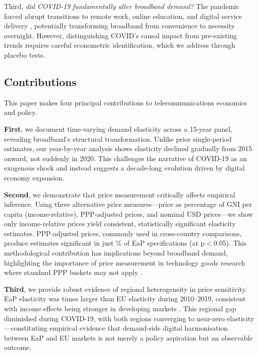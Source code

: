 Third, \textit{did COVID-19 fundamentally alter broadband demand?} The pandemic forced abrupt transitions to remote work, online education, and digital service delivery \citep{oecd2021covid}, potentially transforming broadband from convenience to necessity overnight. However, distinguishing COVID's causal impact from pre-existing trends requires careful econometric identification, which we address through placebo tests.

\subsection{Contributions}

This paper makes four principal contributions to telecommunications economics and policy.

\textbf{First}, we document time-varying demand elasticity across a 15-year panel, revealing broadband's structural transformation. Unlike prior single-period estimates, our year-by-year analysis shows elasticity declined gradually from 2015 onward, not suddenly in 2020. This challenges the narrative of COVID-19 as an exogenous shock and instead suggests a decade-long evolution driven by digital economy expansion.

\textbf{Second}, we demonstrate that price measurement critically affects empirical inference. Using three alternative price measures---price as percentage of GNI per capita (income-relative), PPP-adjusted prices, and nominal USD prices---we show only income-relative prices yield consistent, statistically significant elasticity estimates. PPP-adjusted prices, commonly used in cross-country comparisons, produce estimates significant in just \PctPPPSigEaP\% of EaP specifications (at p$<$0.05). This methodological contribution has implications beyond broadband demand, highlighting the importance of price measurement in technology goods research where standard PPP baskets may not apply \citep{schreyer2002oecd}.

\textbf{Third}, we provide robust evidence of regional heterogeneity in price sensitivity. EaP elasticity was \EaPEURatio{} times larger than EU elasticity during 2010--2019, consistent with income effects being stronger in developing markets \citep{roller2001telecommunications}. This regional gap diminished during COVID-19, with both regions converging to near-zero elasticity---constituting empirical evidence that demand-side digital harmonisation between EaP and EU markets is not merely a policy aspiration but an observable outcome.

